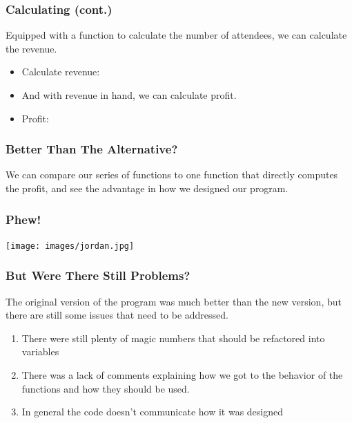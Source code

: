 \documentclass{beamer}
\begin{document}

\begin{frame}
  \frametitle{Calculating (cont.)}
  Equipped with a function to calculate the number of attendees,
  we can calculate the revenue.
  \begin{itemize}
  \item<2-> Calculate revenue: \revenue
  \item<3-> And with revenue in hand, we can calculate profit.
  \item<4-> Profit: \profit    
  \end{itemize}
\end{frame}


\begin{frame}
  \frametitle{Better Than The Alternative?}
  We can compare our series of functions to one function that directly computes
  the profit, and see the advantage in how we designed our program.
  \pause
  \badProgram
\end{frame}

\begin{frame}
  \frametitle{Phew!}
  \begin{center}
    \texttt{[image: images/jordan.jpg]}
  \end{center}
\end{frame}

\begin{frame}
  \frametitle{But Were There Still Problems?}
  The original version of the program was much better than the new version, but
  there are still some issues that need to be addressed.
  \begin{enumerate}
  \item<2-> There were still plenty of magic numbers that should be refactored into variables
  \item<3-> There was a lack of comments explaining how we got to the behavior of
    the functions and how they should be used.
  \item<4-> In general the code doesn't communicate how it was designed
  \end{enumerate}
\end{frame}
\end{document}
